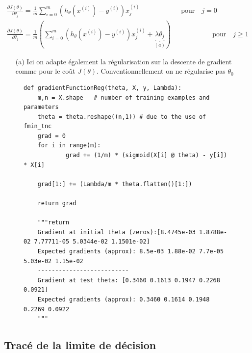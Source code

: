 \begin{align}\label{eq:descente-gradient-reg}
    \frac{\partial J(\theta)}{\partial \theta_j} = \frac{1}{m} \sum_{i=0}^{m} (h_\theta(x^{(i)}) - y^{(i)}) x_j^{(i)} \qquad \qquad \qquad \text{pour} \quad j=0 \\
    \frac{\partial J(\theta)}{\partial \theta_j} = \frac{1}{m} \left( \sum_{i=0}^{m} (h_\theta(x^{(i)}) - y^{(i)}) x_j^{(i)} + \underbrace{\lambda \theta_j}_{(a)} \right) \qquad \qquad \qquad \text{pour} \quad j\geq1 
\end{align}

\begin{itemize}
    \item [(a)] Ici on adapte également la régularisation sur la descente de gradient comme pour le coût $J(\theta)$. Conventionnellement on ne régularise pas $\theta_0$
\end{itemize}

\begin{figure}[!h]
\begin{verbatim}
def gradientFunctionReg(theta, X, y, Lambda):
    m,n = X.shape   # number of training examples and parameters
    theta = theta.reshape((n,1)) # due to the use of fmin_tnc
    grad = 0
    for i in range(m):
            grad += (1/m) * (sigmoid(X[i] @ theta) - y[i]) * X[i]

    grad[1:] += (Lambda/m * theta.flatten()[1:])

    return grad

    """return 
    Gradient at initial theta (zeros):[8.4745e-03 1.8788e-02 7.77711-05 5.0344e-02 1.1501e-02]
    Expected gradients (approx): 8.5e-03 1.88e-02 7.7e-05 5.03e-02 1.15e-02
    -------------------------- 
    Gradient at test theta: [0.3460 0.1613 0.1947 0.2268 0.0921]
    Expected gradients (approx): 0.3460 0.1614 0.1948 0.2269 0.0922
    """
\end{verbatim}   
\end{figure}


\subsection{Tracé de la limite de décision}

